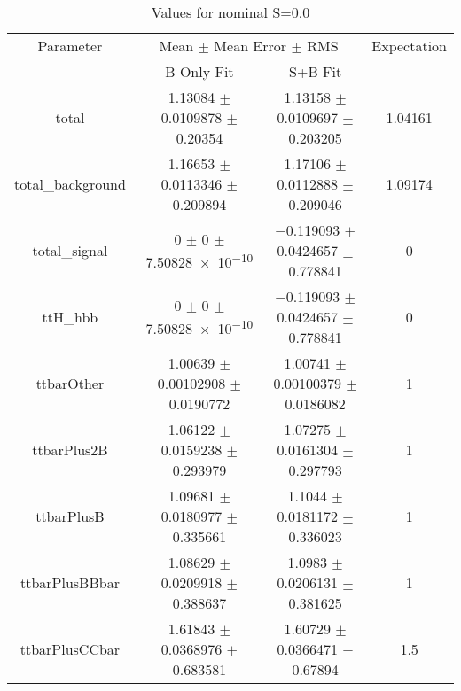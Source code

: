 \begin{table}
\centering
\caption{Values for nominal S=0.0}
\begin{tabular}{cccc}
\toprule
Parameter & \multicolumn{2}{c}{Mean $\pm$ Mean Error $\pm$ RMS} & Expectation\\
 & B-Only Fit & S+B Fit & \\
\midrule
total & \num{1.13084} $\pm$ \num{0.0109878} $\pm$ \num{0.20354} & \num{1.13158} $\pm$ \num{0.0109697} $\pm$ \num{0.203205} & \num{1.04161}\\
total\_background & \num{1.16653} $\pm$ \num{0.0113346} $\pm$ \num{0.209894} & \num{1.17106} $\pm$ \num{0.0112888} $\pm$ \num{0.209046} & \num{1.09174}\\
total\_signal & \num{0} $\pm$ \num{0} $\pm$ \num{7.50828e-10} & \num{-0.119093} $\pm$ \num{0.0424657} $\pm$ \num{0.778841} & \num{0}\\
ttH\_hbb & \num{0} $\pm$ \num{0} $\pm$ \num{7.50828e-10} & \num{-0.119093} $\pm$ \num{0.0424657} $\pm$ \num{0.778841} & \num{0}\\
ttbarOther & \num{1.00639} $\pm$ \num{0.00102908} $\pm$ \num{0.0190772} & \num{1.00741} $\pm$ \num{0.00100379} $\pm$ \num{0.0186082} & \num{1}\\
ttbarPlus2B & \num{1.06122} $\pm$ \num{0.0159238} $\pm$ \num{0.293979} & \num{1.07275} $\pm$ \num{0.0161304} $\pm$ \num{0.297793} & \num{1}\\
ttbarPlusB & \num{1.09681} $\pm$ \num{0.0180977} $\pm$ \num{0.335661} & \num{1.1044} $\pm$ \num{0.0181172} $\pm$ \num{0.336023} & \num{1}\\
ttbarPlusBBbar & \num{1.08629} $\pm$ \num{0.0209918} $\pm$ \num{0.388637} & \num{1.0983} $\pm$ \num{0.0206131} $\pm$ \num{0.381625} & \num{1}\\
ttbarPlusCCbar & \num{1.61843} $\pm$ \num{0.0368976} $\pm$ \num{0.683581} & \num{1.60729} $\pm$ \num{0.0366471} $\pm$ \num{0.67894} & \num{1.5}\\
\bottomrule
\end{tabular}
\end{table}